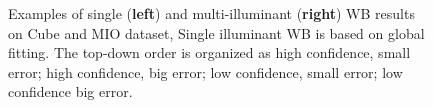 \documentclass[10pt,twocolumn,letterpaper]{article}
\begin{document}
\begin{figure}
\begin{center}
\end{center}
\caption{Examples of single (\textbf{left}) and multi-illuminant (\textbf{right}) WB results on Cube and MIO dataset,
        Single illuminant WB is based on global fitting.
        The top-down order is organized as high confidence, small error;
        high confidence, big error; low confidence, small error; low confidence big error.}
\label{fig:all_results_1}
\end{figure}


{\small
% 


}
\end{document}
